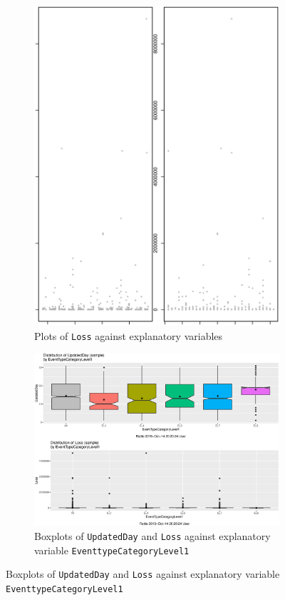 \documentclass{DissertateUSU}
\begin{document}
\begin{figure}
\centering
\begin{subfigure}[b]{0.5\textwidth}
   \includegraphics[width=1\linewidth]{Rplot01.eps}
   \caption{Plots of \texttt{Loss} against explanatory variables }
   \label{fourLossplot1} 
\end{subfigure}

\begin{subfigure}[b]{0.5\textwidth}
   \includegraphics[width=1\linewidth]{Rplot.eps}
   \caption{Boxplots of \texttt{UpdatedDay} and \texttt{Loss} against explanatory variable \texttt{EventtypeCategoryLevel1}}
   \label{fourLossplot2}
\end{subfigure}


\end{figure}
\end{document}
